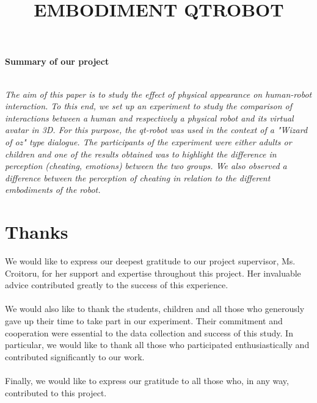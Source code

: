 \documentclass[a4paper, twoside]{report}
\title{EMBODIMENT QTROBOT}
\begin{document}



\vspace*{6cm}
\hspace{3cm}\huge{\textbf{Summary of our project}} \large \\
\\
\begin{center}
\hspace{\parindent} \textit{The aim of this paper is to study the effect of physical appearance on human-robot interaction. To this end, we set up an experiment to study the comparison of interactions between a human and respectively a physical robot and its virtual avatar in 3D. For this purpose, the qt-robot was used in the context of a "Wizard of oz" type dialogue. The participants of the experiment were either adults or children and one of the results obtained was to highlight the difference in perception (cheating, emotions) between the two groups. We also observed a difference between the perception of cheating in relation to the different embodiments of the robot.}
 \\

\end{center}
\clearpage



\section*{Thanks} \large

We would like to express our deepest gratitude to our project supervisor, Ms. Croitoru, for her support and expertise throughout this project. Her invaluable advice contributed greatly to the success of this experience.\\
\\
We would also like to thank the students, children and all those who generously gave up their time to take part in our experiment. Their commitment and cooperation were essential to the data collection and success of this study. In particular, we would like to thank all those who participated enthusiastically and contributed significantly to our work.\\
\\
Finally, we would like to express our gratitude to all those who, in any way, contributed to this project. \\
\end{document}
